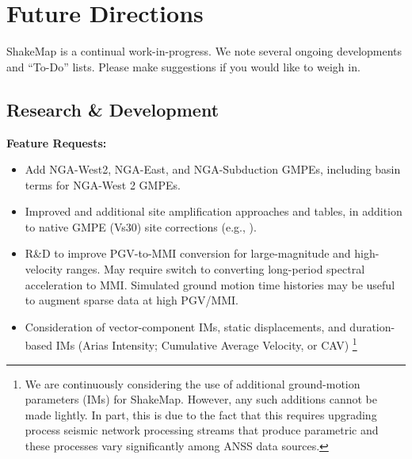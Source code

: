 \documentclass[letterpaper,10pt,english]{sphinxmanual}
\begin{document}
\chapter{Future Directions}
\label{future_directions::doc}\label{future_directions:id1}\label{future_directions:future-directions}
ShakeMap is a continual work-in-progress. We note several ongoing developments and ``To-Do'' lists. Please make suggestions if you would like to weigh in.


\section{Research \& Development}
\label{future_directions:research-development}
\textbf{Feature Requests:}
\begin{itemize}
\item {} 
Add NGA-West2, NGA-East, and NGA-Subduction GMPEs, including basin terms for NGA-West 2 GMPEs.

\item {} 
Improved and additional site amplification approaches and tables, in addition to native GMPE (Vs30) site corrections (e.g., {\hyperref[references:seyhan2014]{}}).

\item {} 
R\&D to improve PGV-to-MMI conversion for large-magnitude and high-velocity ranges. May require switch to converting long-period spectral acceleration
to MMI. Simulated ground motion time histories may be useful to augment sparse data at high PGV/MMI.

\item {} 
Consideration of vector-component IMs, static displacements, and duration-based IMs (Arias Intensity; Cumulative Average Velocity, or CAV) \footnote[1]{\sphinxAtStartFootnote%
We are continuously considering the use of additional ground-motion parameters (IMs)
for ShakeMap. However, any such additions cannot be made lightly. In part, this is
due to the fact that this requires upgrading process seismic network processing streams
that produce parametric and these processes vary significantly among ANSS data sources.
}

\end{itemize}
\end{document}
